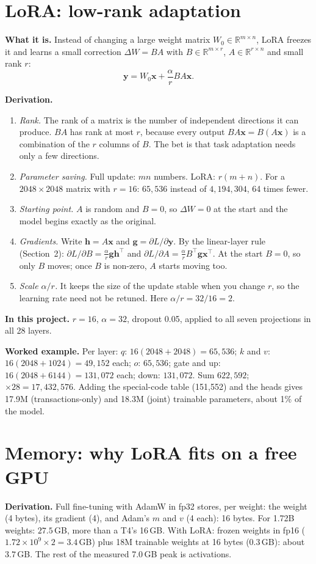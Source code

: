 \documentclass[10pt,a4paper]{article}
\newcommand{\what}[1]{\par\textbf{What it is.} #1}
\newcommand{\here}[1]{\par\textbf{In this project.} #1}
\newcommand{\deriv}{\par\textbf{Derivation.} }
\newcommand{\ex}{\par\textbf{Worked example.} }
\begin{document}
\section{LoRA: low-rank adaptation}\label{sec:lora}
\what{Instead of changing a large weight matrix $W_0\in\mathbb{R}^{m\times n}$, LoRA freezes it and learns a small correction $\Delta W=BA$ with $B\in\mathbb{R}^{m\times r}$, $A\in\mathbb{R}^{r\times n}$ and small rank $r$:
\[\mathbf{y}=W_0\mathbf{x}+\frac{\alpha}{r}BA\mathbf{x}.\]}
\deriv
\begin{enumerate}
\item \emph{Rank.} The rank of a matrix is the number of independent directions it can produce. $BA$ has rank at most $r$, because every output $BA\mathbf{x}=B(A\mathbf{x})$ is a combination of the $r$ columns of $B$. The bet is that task adaptation needs only a few directions.
\item \emph{Parameter saving.} Full update: $mn$ numbers. LoRA: $r(m+n)$. For a $2048\times2048$ matrix with $r=16$: $65{,}536$ instead of $4{,}194{,}304$, 64 times fewer.
\item \emph{Starting point.} $A$ is random and $B=0$, so $\Delta W=0$ at the start and the model begins exactly as the original.
\item \emph{Gradients.} Write $\mathbf{h}=A\mathbf{x}$ and $\mathbf{g}=\partial L/\partial\mathbf{y}$. By the linear-layer rule (Section~2): $\partial L/\partial B=\frac{\alpha}{r}\mathbf{g}\mathbf{h}^\top$ and $\partial L/\partial A=\frac{\alpha}{r}B^\top\mathbf{g}\mathbf{x}^\top$. At the start $B=0$, so only $B$ moves; once $B$ is non-zero, $A$ starts moving too.
\item \emph{Scale $\alpha/r$.} It keeps the size of the update stable when you change $r$, so the learning rate need not be retuned. Here $\alpha/r=32/16=2$.
\end{enumerate}
\here{$r=16$, $\alpha=32$, dropout 0.05, applied to all seven projections in all 28 layers.}
\ex Per layer: $q$: $16(2048+2048)=65{,}536$; $k$ and $v$: $16(2048+1024)=49{,}152$ each; $o$: $65{,}536$; gate and up: $16(2048+6144)=131{,}072$ each; down: $131{,}072$. Sum $622{,}592$; $\times28=17{,}432{,}576$. Adding the special-code table (151,552) and the heads gives 17.9M (transactions-only) and 18.3M (joint) trainable parameters, about 1\% of the model.

\section{Memory: why LoRA fits on a free GPU}
\deriv Full fine-tuning with AdamW in fp32 stores, per weight: the weight (4 bytes), its gradient (4), and Adam's $m$ and $v$ (4 each): 16 bytes. For 1.72B weights: $27.5$\,GB, more than a T4's 16\,GB. With LoRA: frozen weights in fp16 ($1.72\times10^9\times2=3.4$\,GB) plus 18M trainable weights at 16 bytes ($0.3$\,GB): about $3.7$\,GB. The rest of the measured 7.0\,GB peak is activations.
\end{document}
